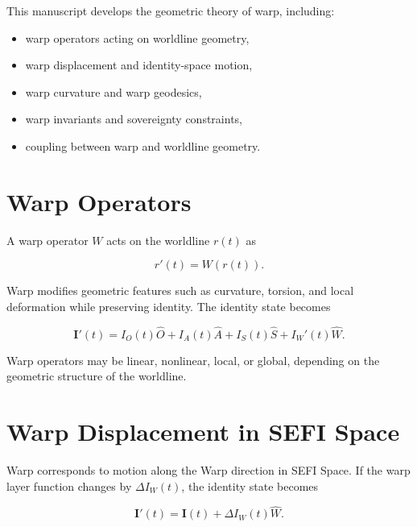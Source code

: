 \documentclass[12pt,twoside]{article}
\begin{document}
This manuscript develops the geometric theory of warp, including:

\begin{itemize}
    \item warp operators acting on worldline geometry,
    \item warp displacement and identity-space motion,
    \item warp curvature and warp geodesics,
    \item warp invariants and sovereignty constraints,
    \item coupling between warp and worldline geometry.
\end{itemize}

\section{Warp Operators}

A warp operator $W$ acts on the worldline $r(t)$ as



\[
r'(t) = W(r(t)).
\]



Warp modifies geometric features such as curvature, torsion, and local deformation while
preserving identity. The identity state becomes



\[
\mathbf{I}'(t) = I_{O}(t)\hat{O} + I_{A}(t)\hat{A} + I_{S}(t)\hat{S} + I_{W}'(t)\hat{W}.
\]



Warp operators may be linear, nonlinear, local, or global, depending on the geometric
structure of the worldline.

\section{Warp Displacement in SEFI Space}

Warp corresponds to motion along the Warp direction in SEFI Space. If the warp layer
function changes by $\Delta I_{W}(t)$, the identity state becomes



\[
\mathbf{I}'(t) = \mathbf{I}(t) + \Delta I_{W}(t)\hat{W}.
\]
\end{document}
